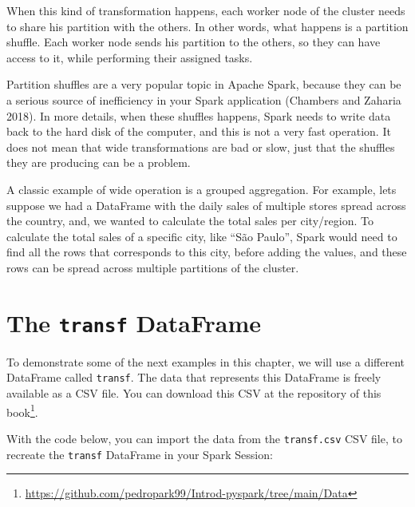 \documentclass[
  11pt,
  letterpaper,
  DIV=11,
  numbers=noendperiod]{scrreprt}
\begin{document}
When this kind of transformation happens, each worker node of the
cluster needs to share his partition with the others. In other words,
what happens is a partition shuffle. Each worker node sends his
partition to the others, so they can have access to it, while performing
their assigned tasks.

Partition shuffles are a very popular topic in Apache Spark, because
they can be a serious source of inefficiency in your Spark application
(Chambers and Zaharia 2018). In more details, when these shuffles
happens, Spark needs to write data back to the hard disk of the
computer, and this is not a very fast operation. It does not mean that
wide transformations are bad or slow, just that the shuffles they are
producing can be a problem.

A classic example of wide operation is a grouped aggregation. For
example, lets suppose we had a DataFrame with the daily sales of
multiple stores spread across the country, and, we wanted to calculate
the total sales per city/region. To calculate the total sales of a
specific city, like ``São Paulo'', Spark would need to find all the rows
that corresponds to this city, before adding the values, and these rows
can be spread across multiple partitions of the cluster.

\hypertarget{the-transf-dataframe}{%
\section{\texorpdfstring{The \texttt{transf}
DataFrame}{The transf DataFrame}}\label{the-transf-dataframe}}

To demonstrate some of the next examples in this chapter, we will use a
different DataFrame called \texttt{transf}. The data that represents
this DataFrame is freely available as a CSV file. You can download this
CSV at the repository of this book\footnote{\url{https://github.com/pedropark99/Introd-pyspark/tree/main/Data}}.

With the code below, you can import the data from the
\texttt{transf.csv} CSV file, to recreate the \texttt{transf} DataFrame
in your Spark Session:
\end{document}
